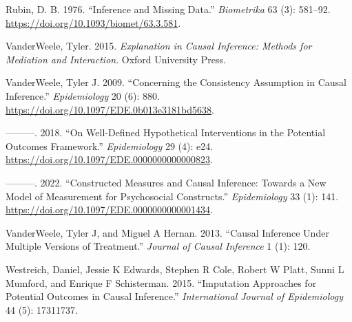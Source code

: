 \documentclass[
  singlecolumn]{report}
\newlength{\cslhangindent}
\newlength{\cslentryspacingunit} %
\newenvironment{CSLReferences}[2] %
 {%
  \setlength{\parindent}{0pt}
  \ifodd #1
  \let\oldpar\par
  \def\par{\hangindent=\cslhangindent\oldpar}
  \fi
  \setlength{\parskip}{#2\cslentryspacingunit}
 }%
 {}
\begin{document}
\begin{CSLReferences}{1}{0}
\leavevmode{}%
Rubin, D. B. 1976. {``Inference and Missing Data.''} \emph{Biometrika}
63 (3): 581--92. \url{https://doi.org/10.1093/biomet/63.3.581}.

\leavevmode{}%
VanderWeele, Tyler. 2015. \emph{Explanation in Causal Inference: Methods
for Mediation and Interaction}. Oxford University Press.

\leavevmode{}%
VanderWeele, Tyler J. 2009. {``Concerning the Consistency Assumption in
Causal Inference.''} \emph{Epidemiology} 20 (6): 880.
\url{https://doi.org/10.1097/EDE.0b013e3181bd5638}.

\leavevmode{}%
---------. 2018. {``On Well-Defined Hypothetical Interventions in the
Potential Outcomes Framework.''} \emph{Epidemiology} 29 (4): e24.
\url{https://doi.org/10.1097/EDE.0000000000000823}.

\leavevmode{}%
---------. 2022. {``Constructed Measures and Causal Inference: Towards a
New Model of Measurement for Psychosocial Constructs.''}
\emph{Epidemiology} 33 (1): 141.
\url{https://doi.org/10.1097/EDE.0000000000001434}.

\leavevmode{}%
VanderWeele, Tyler J, and Miguel A Hernan. 2013. {``Causal Inference
Under Multiple Versions of Treatment.''} \emph{Journal of Causal
Inference} 1 (1): 120.

\leavevmode{}%
Westreich, Daniel, Jessie K Edwards, Stephen R Cole, Robert W Platt,
Sunni L Mumford, and Enrique F Schisterman. 2015. {``Imputation
Approaches for Potential Outcomes in Causal Inference.''}
\emph{International Journal of Epidemiology} 44 (5): 17311737.

\end{CSLReferences}
\end{document}
